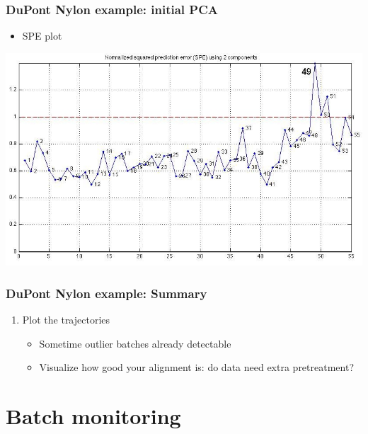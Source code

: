 \documentclass[handout, 12pt]{beamer}
\begin{document}
\begin{frame}\frametitle{DuPont Nylon example: initial PCA}
	\begin{itemize}
		\item	SPE plot
	\end{itemize}
	
	\begin{center}
		\includegraphics[width=\textwidth]{images/dupont/dupont-raw-SPE.jpg}
	\end{center}
\end{frame}





\begin{frame}\frametitle{DuPont Nylon example: Summary}
	
\begin{enumerate}
	\item	Plot the trajectories
	
			\begin{itemize}
				\item	Sometime outlier batches already detectable
				
				\item	Visualize how good your alignment is: do data need extra pretreatment?
			\end{itemize}
\end{enumerate}


	
\end{frame}

\section{Batch monitoring}

%
\end{document}
